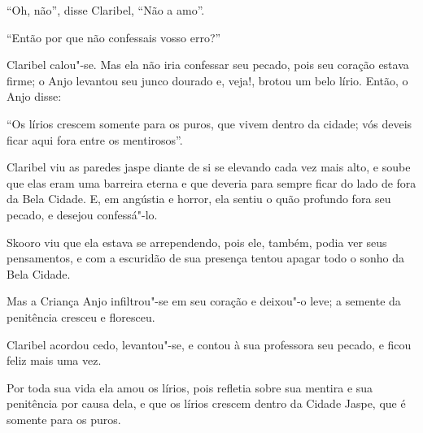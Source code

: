 ``Oh, não'', disse Claribel, ``Não a amo''.

``Então por que não confessais vosso erro?''

Claribel calou"-se. Mas ela não iria confessar seu pecado, pois seu
coração estava firme; o Anjo levantou seu junco dourado e, veja!, brotou
um belo lírio. Então, o Anjo disse:

``Os lírios crescem somente para os puros, que vivem dentro da cidade;
vós deveis ficar aqui fora entre os mentirosos''.

Claribel viu as paredes jaspe diante de si se elevando cada vez mais
alto, e soube que elas eram uma barreira eterna e que deveria para
sempre ficar do lado de fora da Bela Cidade. E, em angústia e horror,
ela sentiu o quão profundo fora seu pecado, e desejou confessá"-lo.

Skooro viu que ela estava se arrependendo, pois ele, também, podia ver
seus pensamentos, e com a escuridão de sua presença tentou apagar todo o
sonho da Bela Cidade.

Mas a Criança Anjo infiltrou"-se em seu coração e deixou"-o leve; a
semente da penitência cresceu e floresceu.

Claribel acordou cedo, levantou"-se, e contou à sua professora seu
pecado, e ficou feliz mais uma vez.

Por toda sua vida ela amou os lírios, pois refletia sobre sua mentira e
sua penitência por causa dela, e que os lírios crescem dentro da Cidade
Jaspe, que é somente para os puros.


